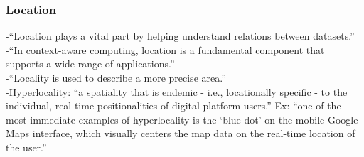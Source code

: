 \subsubsection{Location}
-{\color{orange}“Location plays a vital part by helping understand relations between datasets.”}\cite{Bhattacharya2018}\\
-{\color{orange}“In context-aware computing, location is a fundamental component that supports a wide-range of applications.”\cite{Al-Olimat2018}}\\
-{\color{orange}“Locality is used to describe a more precise area.”\cite{Imani2019}}\\
-{\color{orange}Hyperlocality: “a spatiality that is endemic - i.e., locationally specific - to the individual, real-time positionalities of digital platform users.” Ex:  “one of the most immediate examples of hyperlocality is the ‘blue dot’ on the mobile Google Maps interface, which visually centers the map data on the real-time location of the user.”\cite{Leszczynski2019}}\\

